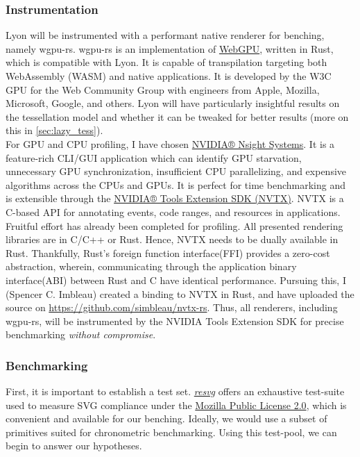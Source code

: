 \subsubsection{Instrumentation}

Lyon will be instrumented with a performant native renderer for benching, namely wgpu-rs. wgpu-rs is an implementation of \href{https://www.w3.org/community/gpu/}{WebGPU}, written in Rust, which is compatible with Lyon. It is capable of transpilation targeting both WebAssembly (WASM) and native applications. It is developed by the W3C GPU for the Web Community Group with engineers from Apple, Mozilla, Microsoft, Google, and others\cite{WebGPU}. Lyon will have particularly insightful results on the tessellation model and whether it can be tweaked for better results (more on this in \ref{sec:lazy_tess}).\\

For GPU and CPU profiling, I have chosen \href{https://developer.nvidia.com/nsight-systems}{NVIDIA® Nsight Systems}. It is a feature-rich CLI/GUI application which can identify GPU starvation, unnecessary GPU synchronization, insufficient CPU parallelizing, and expensive algorithms across the CPUs and GPUs. It is perfect for time benchmarking and is extensible through the \href{https://docs.nvidia.com/gameworks/content/gameworkslibrary/nvtx/nvidia_tools_extension_library_nvtx.htm}{NVIDIA® Tools Extension SDK (NVTX)}. NVTX is a C-based API for annotating events, code ranges, and resources in applications.\\

Fruitful effort has already been completed for profiling. All presented rendering libraries are in C/C++ or Rust. Hence, NVTX needs to be dually available in Rust. Thankfully, Rust's foreign function interface(FFI) provides a zero-cost abstraction, wherein, communicating through the application binary interface(ABI) between Rust and C have identical performance. Pursuing this, I (Spencer C. Imbleau) created a binding to NVTX in Rust, and have uploaded the source on \href{https://github.com/simbleau/nvtx-rs}{https://github.com/simbleau/nvtx-rs}. Thus, all renderers, including wgpu-rs, will be instrumented by the NVIDIA Tools Extension SDK for precise benchmarking \emph{without compromise}.

\subsubsection{Benchmarking}

First, it is important to establish a test set. \href{https://github.com/RazrFalcon/resvg}{\emph{resvg}} offers an exhaustive test-suite used to measure SVG compliance under the \href{https://www.mozilla.org/en-US/MPL/}{Mozilla Public License 2.0}, which is convenient and available for our benching. Ideally, we would use a subset of primitives suited for chronometric benchmarking. Using this test-pool, we can begin to answer our hypotheses.\\

